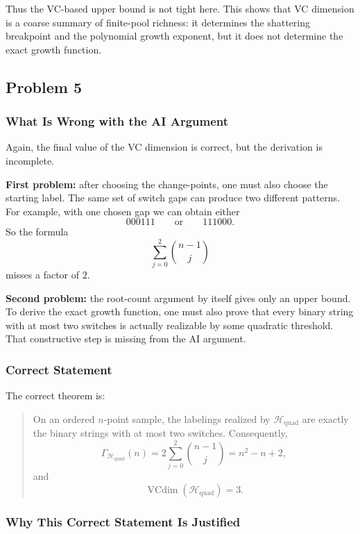 \documentclass{article}
\begin{document}
Thus the VC-based upper bound is not tight here. This shows that VC dimension is a coarse summary of finite-pool richness: it determines the shattering breakpoint and the polynomial growth exponent, but it does not determine the exact growth function.

\subsection{Problem 5}

\subsubsection{What Is Wrong with the AI Argument}

Again, the final value of the VC dimension is correct, but the derivation is incomplete.

\textbf{First problem:} after choosing the change-points, one must also choose the starting label. The same set of switch gaps can produce two different patterns. For example, with one chosen gap we can obtain either
$$
000111
\qquad \text{or} \qquad
111000.
$$
So the formula
$$
\sum_{j=0}^2 \binom{n-1}{j}
$$
misses a factor of $2$.

\textbf{Second problem:} the root-count argument by itself gives only an upper bound. To derive the exact growth function, one must also prove that every binary string with at most two switches is actually realizable by some quadratic threshold. That constructive step is missing from the AI argument.

\subsubsection{Correct Statement}

The correct theorem is:

\begin{quote}
On an ordered $n$-point sample, the labelings realized by $\mathcal{H}_{\mathrm{quad}}$ are exactly the binary strings with at most two switches. Consequently,
$$
\Gamma_{\mathcal{H}_{\mathrm{quad}}}(n)
=
2 \sum_{j=0}^2 \binom{n-1}{j}
=
n^2 - n + 2,
$$
and
$$
\operatorname{VCdim}(\mathcal{H}_{\mathrm{quad}}) = 3.
$$
\end{quote}

\subsubsection{Why This Correct Statement Is Justified}
\end{document}
